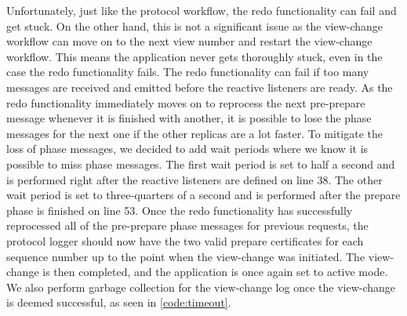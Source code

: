 Unfortunately, just like the protocol workflow, the redo functionality can fail and get stuck. On the other hand, this is not a significant issue as the view-change workflow can move on to the next view number and restart the view-change workflow. This means the application never gets thoroughly stuck, even in the case the redo functionality fails. The redo functionality can fail if too many messages are received and emitted before the reactive listeners are ready. As the redo functionality immediately moves on to reprocess the next pre-prepare message whenever it is finished with another, it is possible to lose the phase messages for the next one if the other replicas are a lot faster. To mitigate the loss of phase messages, we decided to add wait periods where we know it is possible to miss phase messages. The first wait period is set to half a second and is performed right after the reactive listeners are defined on line 38. The other wait period is set to three-quarters of a second and is performed after the prepare phase is finished on line 53. Once the redo functionality has successfully reprocessed all of the pre-prepare phase messages for previous requests, the protocol logger should now have the two valid prepare certificates for each sequence number up to the point when the view-change was initiated. The view-change is then completed, and the application is once again set to active mode. We also perform garbage collection for the view-change log once the view-change is deemed successful, as seen in \autoref{code:timeout}.

